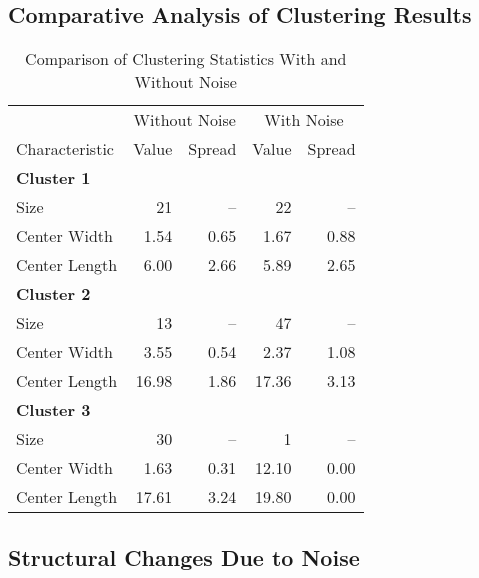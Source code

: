 \documentclass[12pt]{article}
\begin{document}
\subsection{Comparative Analysis of Clustering Results}

\begin{table}[H]
\centering
\begin{tabular}{lrr|rr}
\toprule
& \multicolumn{2}{c|}{Without Noise} & \multicolumn{2}{c}{With Noise} \\
\cmidrule(lr){2-3} \cmidrule(lr){4-5}
Characteristic & Value & Spread & Value & Spread \\
\midrule
\multicolumn{5}{l}{\textbf{Cluster 1}} \\
Size & 21 & -- & 22 & -- \\
Center Width & 1.54 & 0.65 & 1.67 & 0.88 \\
Center Length & 6.00 & 2.66 & 5.89 & 2.65 \\
\midrule
\multicolumn{5}{l}{\textbf{Cluster 2}} \\
Size & 13 & -- & 47 & -- \\
Center Width & 3.55 & 0.54 & 2.37 & 1.08 \\
Center Length & 16.98 & 1.86 & 17.36 & 3.13 \\
\midrule
\multicolumn{5}{l}{\textbf{Cluster 3}} \\
Size & 30 & -- & 1 & -- \\
Center Width & 1.63 & 0.31 & 12.10 & 0.00 \\
Center Length & 17.61 & 3.24 & 19.80 & 0.00 \\
\bottomrule
\end{tabular}
\caption{Comparison of Clustering Statistics With and Without Noise}
\end{table}

\subsection{Structural Changes Due to Noise}
\end{document}
